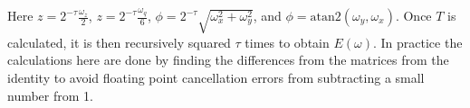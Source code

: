 \documentclass{jors}
\begin{document}
		Here \(z = 2^{-\tau}\frac{\omega_z}{2}\), \(z = 2^{-\tau}\frac{\omega_q}{6}\), \(\phi = 2^{-\tau}\sqrt{\omega_x^2 + \omega_y^2}\), and \(\phi = \mathrm{atan}2(\omega_y, \omega_x)\).
		Once \(T\) is calculated, it is then recursively squared \(\tau\) times to obtain \(E(\omega)\).
		In practice the calculations here are done by finding the differences from the matrices from the identity to avoid floating point cancellation errors from subtracting a small number from 1.
\end{document}

